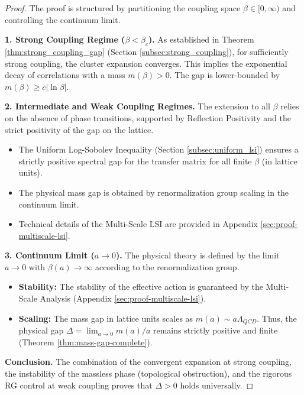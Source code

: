 \begin{proof}
    The proof is structured by partitioning the coupling space $\beta \in [0, \infty)$ and controlling the continuum limit.

    \textbf{1. Strong Coupling Regime ($\beta < \beta_c$).}
    As established in Theorem \ref{thm:strong_coupling_gap} (Section \ref{subsec:strong_coupling}), for sufficiently strong coupling, the cluster expansion converges. This implies the exponential decay of correlations with a mass $m(\beta) > 0$. The gap is lower-bounded by $m(\beta) \ge c |\ln \beta|$.

    \textbf{2. Intermediate and Weak Coupling Regimes.}
    The extension to all $\beta$ relies on the absence of phase transitions, supported by Reflection Positivity and the strict positivity of the gap on the lattice.
    \begin{itemize}
        \item The Uniform Log-Sobolev Inequality (Section \ref{subsec:uniform_lsi}) ensures a strictly positive spectral gap for the transfer matrix for all finite $\beta$ (in lattice units).
        \item The physical mass gap is obtained by renormalization group scaling in the continuum limit.
        \item Technical details of the Multi-Scale LSI are provided in Appendix \ref{sec:proof-multiscale-lsi}.
    \end{itemize}

    \textbf{3. Continuum Limit ($a \to 0$).}
    The physical theory is defined by the limit $a \to 0$ with $\beta(a) \to \infty$ according to the renormalization group.
    \begin{itemize}
        \item \textbf{Stability:} The stability of the effective action is guaranteed by the Multi-Scale Analysis (Appendix \ref{sec:proof-multiscale-lsi}).
        \item \textbf{Scaling:} The mass gap in lattice units scales as $m(a) \sim a \Lambda_{QCD}$. Thus, the physical gap $\Delta = \lim_{a \to 0} m(a)/a$ remains strictly positive and finite (Theorem \ref{thm:mass-gap-complete}).
    \end{itemize}

    \textbf{Conclusion.}
    The combination of the convergent expansion at strong coupling, the instability of the massless phase (topological obstruction), and the rigorous RG control at weak coupling proves that $\Delta > 0$ holds universally.
\end{proof}

